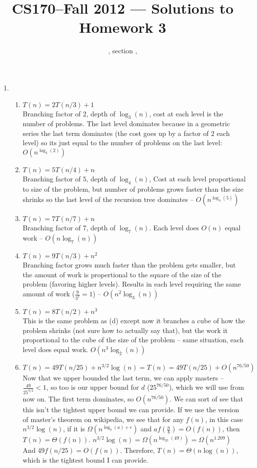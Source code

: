 \documentclass[11pt]{article}
\title{CS170--Fall 2012 --- Solutions to Homework 3}
\author{\Name, section \Sec, \texttt{\Login}}
\begin{document}
\maketitle

\begin{enumerate}
\item 
\begin{enumerate}
\item $T(n)=2T(n/3)+1$\\
Branching factor of 2, depth of $\log_3(n)$, cost at each level is the number of problems. The last level dominates because in a geometric series the last term dominates (the cost goes up by a factor of 2 each level) so its just equal to the number of problems on the last level: $O(n^{\log_3(2)})$
\item $T(n)=5T(n/4)+n$\\
Branching factor of $5$, depth of $\log_4(n)$, Cost at each level proportional to size of the problem, but number of problems grows faster than the size shrinks so the last level of the recursion tree dominates -- $O(n^{\log_4(5)})$
\item $T(n)=7T(n/7)+n$\\
Branching factor of 7, depth of $\log_7(n)$. Each level does $O(n)$ equal work -- $O(n\log_7(n))$
\item $T(n)=9T(n/3)+n^2$\\
Branching factor grows much faster than the problem gets smaller, but the amount of work is propertional to the square of the size of the problem (favoring higher levels). Results in each level requiring the same amount of work ($\frac{9}{3^2}=1$) -- $O(n^2\log_3(n))$
\item $T(n)=8T(n/2)+n^3$ \\
This is the same problem as (d) except now it branches a cube of how the problem shrinks (not sure how to actually say that), but the work it proportional to the cube of the size of the problem -- same situation, each level does equal work. $O(n^3\log_2(n))$
\item $T(n)=49T(n/25)+n^{3/2}\log(n)=T(n)=49T(n/25)+O(n^{76/50})$\\
Now that we upper bounded the last term, we can apply masters -- 
$\frac{49}{25^{3/2}}<1$, so too is our upper bound for $d$ ($25^{76/50}$), which we will use from now on. The first term dominates, so  $O(n^{76/50})$. We can sort of see that this isn't the tightest upper bound we can provide. If we use the version of master's theorem on wikipedia, we see that for any $f(n)$, in this case $n^{3/2}\log(n)$, if it is $\Omega(n^{\log_b(a)+\epsilon})$ and $af(\frac{n}{b})=O(f(n))$, then $T(n)=\Theta(f(n))$. $n^{3/2}\log(n)=\Omega(n^{\log_25(49)})=\Omega(n^{1.209})$ And $49f(n/25)=O(f(n))$. Therefore, $T(n)=\Theta(n\log(n))$, which is the tightest bound I can provide.

\end{enumerate}
\end{enumerate}
\end{document}
